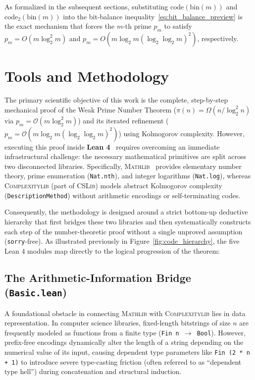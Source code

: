 \documentclass[acmsmall,natbib=false,nonacm]{acmart}
\begin{document}
As formalized in the subsequent sections, substituting $\text{code}(\text{bin}(m))$ and $\text{code}_2(\text{bin}(m))$ into the bit-balance inequality~\eqref{eq:bit_balance_preview} is the exact mechanism that forces the $m$-th prime $p_m$ to satisfy $p_m = O(m \log_2^2 m)$ and $p_m = O(m \log_2 m (\log_2 \log_2 m)^2)$, respectively.

\section{Tools and Methodology}
\label{sec:methodology}

The primary scientific objective of this work is the complete, step-by-step mechanical proof of the Weak Prime Number Theorem ($\pi(n) = \Omega(n / \log_2^2 n)$ via $p_m = \mathcal{O}(m \log_2^2 m)$) and its iterated refinement ($p_m = \mathcal{O}(m \log_2 m (\log_2 \log_2 m)^2)$) using Kolmogorov complexity. However, executing this proof inside \textbf{Lean 4}~\cite{moura2021lean} requires overcoming an immediate infrastructural challenge: the necessary mathematical primitives are split across two disconnected libraries. Specifically, \textsc{Mathlib}~\cite{mathlib2020} provides elementary number theory, prime enumeration (\texttt{Nat.nth}), and integer logarithms (\texttt{Nat.log}), whereas \textsc{Complexitylib} (part of \textsc{CSLib}) models abstract Kolmogorov complexity (\texttt{DescriptionMethod}) without arithmetic encodings or self-terminating codes.

Consequently, the methodology is designed around a strict bottom-up deductive hierarchy that first bridges these two libraries and then systematically constructs each step of the number-theoretic proof without a single unproved assumption (\texttt{sorry}-free). As illustrated previously in Figure~\ref{fig:code_hierarchy}, the five Lean 4 modules map directly to the logical progression of the theorem:

\subsection{The Arithmetic-Information Bridge (\texttt{Basic.lean})}
A foundational obstacle in connecting \textsc{Mathlib} with \textsc{Complexitylib} lies in data representation. In computer science libraries, fixed-length bitstrings of size $n$ are frequently modeled as functions from a finite type (\texttt{Fin n $\to$ Bool}). However, prefix-free encodings dynamically alter the length of a string depending on the numerical value of its input, causing dependent type parameters like \texttt{Fin (2 * n + 1)} to introduce severe type-casting friction (often referred to as ``dependent type hell'') during concatenation and structural induction.
\end{document}
